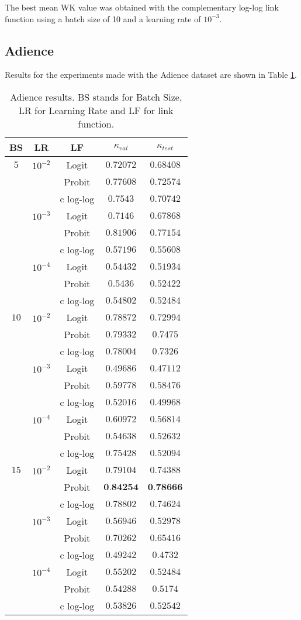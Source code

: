 \documentclass[10pt, a4paper, titlepage, twocolumn]{article}
\begin{document}
	The best mean WK value was obtained with the complementary log-log link function using a batch size of 10 and a learning rate of $10^{-3}$.
	
	\subsection{Adience}
	Results for the experiments made with the Adience dataset are shown in Table \ref{table:Adienceresults}.
	
	\begin{table}[ht]
		\footnotesize
		\centering
		\begin{tabular}{ccc|cc}
			BS & LR & LF & $\kappa_{val}$ & $\kappa_{test}$\\\hline\addlinespace[0.05cm]
			$5$ & $10^{-2}$ & Logit & $0.72072$ & $0.68408$\\
			& & Probit & $0.77608$ & $0.72574$\\
			& & c log-log & $0.7543$ & $0.70742$\\
			& $10^{-3}$ & Logit & $0.7146$ & $0.67868$\\
			& & Probit & $0.81906$ & $0.77154$\\
			& & c log-log & $0.57196$ & $0.55608$\\
			& $10^{-4}$ & Logit & $0.54432$ & $0.51934$\\
			& & Probit & $0.5436$ & $0.52422$\\
			& & c log-log & $0.54802$ & $0.52484$\\
			$10$ & $10^{-2}$ & Logit & $0.78872$ & $0.72994$\\
			& & Probit & $0.79332$ & $0.7475$\\
			& & c log-log & $0.78004$ & $0.7326$\\
			& $10^{-3}$ & Logit & $0.49686$ & $0.47112$\\
			& & Probit & $0.59778$ & $0.58476$\\
			& & c log-log & $0.52016$ & $0.49968$\\
			& $10^{-4}$ & Logit & $0.60972$ & $0.56814$\\
			& & Probit & $0.54638$ & $0.52632$\\
			& & c log-log & $0.75428$ & $0.52094$\\
			$15$ & $10^{-2}$ & Logit & $0.79104$ & $0.74388$\\
			& & Probit & $\textbf{0.84254}$ & $\textbf{0.78666}$\\
			& & c log-log & $0.78802$ & $0.74624$\\
			& $10^{-3}$ & Logit & $0.56946$ & $0.52978$\\
			& & Probit & $0.70262$ & $0.65416$\\
			& & c log-log & $0.49242$ & $0.4732$\\
			& $10^{-4}$ & Logit & $0.55202$ & $0.52484$\\
			& & Probit & $0.54288$ & $0.5174$\\
			& & c log-log & $0.53826$ & $0.52542$
		\end{tabular}
		\caption{Adience results. BS stands for Batch Size, LR for Learning Rate and LF for link function.}
		\label{table:Adienceresults}
	\end{table}
	
\end{document}
